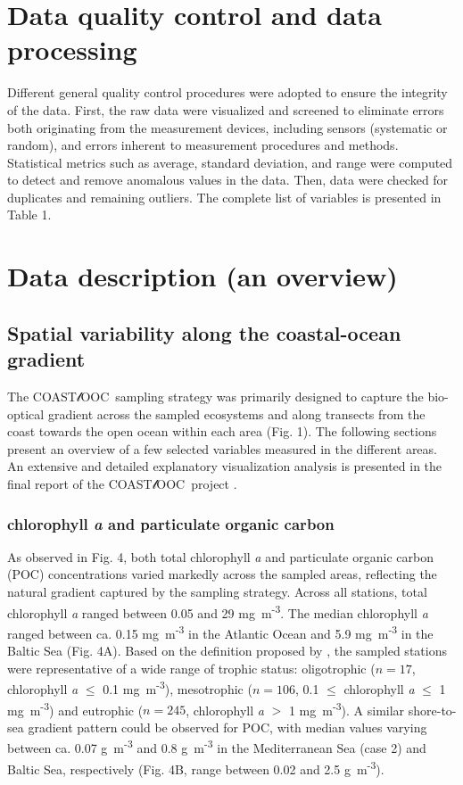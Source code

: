 \documentclass[essd, manuscript]{copernicus}
\newcommand{\coastlooc}{COAST$\mathscr{l}$OOC~\allowbreak}
\begin{document}
\section{Data quality control and data processing}

Different general quality control procedures were adopted to ensure the integrity of the data. First, the raw data were visualized and screened to eliminate errors both originating from the measurement devices, including sensors (systematic or random), and errors inherent to measurement procedures and methods. Statistical metrics such as average, standard deviation, and range were computed to detect and remove anomalous values in the data. Then, data were checked for duplicates and remaining outliers. The complete list of variables is presented in Table 1.

\section{Data description (an overview)}

\subsection{Spatial variability along the coastal-ocean gradient}

The \coastlooc sampling strategy was primarily designed to capture the bio-optical gradient across the sampled ecosystems and along transects from the coast towards the open ocean within each area (Fig. 1). The following sections present an overview of a few selected variables measured in the different areas. An extensive and detailed explanatory visualization analysis is presented in the final report of the \coastlooc project \citep{Coastlooc2000}.

\subsubsection{chlorophyll \textit{a} and particulate organic carbon}

As observed in Fig. 4, both total chlorophyll \textit{a} and particulate organic carbon (POC) concentrations varied markedly across the sampled areas, reflecting the natural gradient captured by the sampling strategy. Across all stations, total chlorophyll \textit{a} ranged between 0.05 and 29 mg~m\textsuperscript{-3}. The median chlorophyll \textit{a} ranged between ca. 0.15 mg~m\textsuperscript{-3} in the Atlantic Ocean and 5.9 mg~m\textsuperscript{-3} in the Baltic Sea (Fig. 4A). Based on the definition proposed by \citealt{Antoine1996}, the sampled stations were representative of a wide range of trophic status: oligotrophic ($n = 17$, chlorophyll \textit{a} $\le$ 0.1 mg~m\textsuperscript{-3}), mesotrophic ($n = 106$, 0.1 $\le$ chlorophyll \textit{a} $\le$ 1 mg~m\textsuperscript{-3}) and eutrophic ($n = 245$, chlorophyll \textit{a} $>$ 1 mg~m\textsuperscript{-3}). A similar shore-to-sea gradient pattern could be observed for POC, with median values varying between ca. 0.07 g~m\textsuperscript{-3} and 0.8 g~m\textsuperscript{-3} in the Mediterranean Sea (case 2) and Baltic Sea, respectively (Fig. 4B, range between 0.02 and 2.5 g~m\textsuperscript{-3}).
\end{document}
